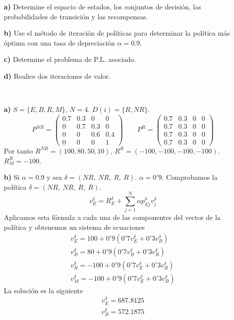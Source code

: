 \documentclass[twoside]{article}
\begin{document}
\begin{ejercicio}{1}
\begin{itemize}
\item[\textbf{a)}] Determine el espacio de estados, los conjuntos de decisión, las probabilidades de transición y las recompensas.
\item[\textbf{b)}] Use el método de iteración de políticas para determinar la política más óptima con una tasa de depreciación $\alpha=$0.9.
\item[\textbf{c)}] Determine el problema de P.L. asociado.
\item[\textbf{d)}] Realice dos iteraciones de valor.
\end{itemize}
\begin{solucion}\
\begin{itemize}
\item[\textbf{a)}] $S=\{E,B,R,M\}$, $N=4$. $D(i)=\{R,NR\}$. 
$$
P^{NR} = 
\begin{pmatrix}
0.7 & 0.3 & 0 & 0\\
0   & 0.7 & 0.3& 0\\
0 & 0 & 0.6 & 0.4\\
0 & 0 & 0 & 1
\end{pmatrix} \qquad
P^R = 
\begin{pmatrix}
0.7 & 0.3 & 0 & 0\\
0.7 & 0.3 & 0 & 0\\
0.7 & 0.3 & 0 & 0\\
0.7 & 0.3 & 0 & 0
\end{pmatrix}
$$
Por tanto $R^{NR} = (100, 80, 50, 10)$, $R^R = (-100, -100, -100, -100)$. $R^R_M = -100$.
\item[\textbf{b)}] Si $\alpha = 0.9$ y sea $\delta = (NR,\ NR,\ R,\ R)$.
$\alpha=0'9$. Comprobamos la política $\delta=(NR,\ NR,\ R,\ R)$. 
$$v^\delta_E=R^\delta_E+\sum_{j=1}^N\alpha p^\delta_{Ej}v^\delta_j$$
Aplicamos esta fórmula a cada una de las componentes del vector de la política y obtenemos un sistema de ecuaciones
\begin{align*}
v^\delta_E=100+0'9(0'7v^\delta_E+0'3v^\delta_B)\\
v^\delta_B=80+0'9(0'7v^\delta_B+0'3v^\delta_R)\\
v^\delta_R=-100+0'9(0'7v^\delta_E+0'3v^\delta_B)\\
v^\delta_M=-100+0'9(0'7v^\delta_E+0'3v^\delta_B)
\end{align*}
La solución es la siguiente
\begin{align*}
v^\delta_E=687.8125\\
v^\delta_B=572.1875\\

\end{align*}
\end{itemize}
\end{solucion}
\end{ejercicio}
\end{document}
